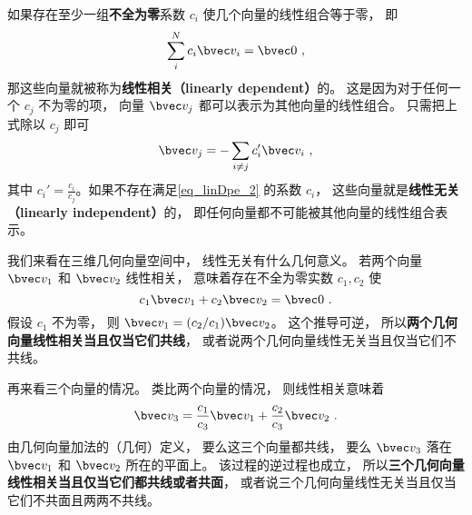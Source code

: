 
\begin{issues}
\issueDraft
\end{issues}


% 

如果存在至少一组\textbf{不全为零}系数 $c_i$ 使几个向量的线性组合等于零， 即
\begin{equation}\label{eq_linDpe_2}
\sum_i^N c_i \bvec v_i = \bvec 0~,
\end{equation}
那这些向量就被称为\textbf{线性相关（linearly dependent）}的。 这是因为对于任何一个 $c_j$ 不为零的项， 向量 $\bvec v_j$ 都可以表示为其他向量的线性组合。 只需把上式除以 $c_j$ 即可
\begin{equation}\label{eq_linDpe_3}
\bvec v_j = -\sum_{i \ne j} c_i' \bvec v_i~,
\end{equation}
其中 $c_i' = \frac{c_i}{c_j}$。如果不存在满足\autoref{eq_linDpe_2} 的系数 $c_i$， 这些向量就是\textbf{线性无关（linearly independent）}的， 即任何向量都不可能被其他向量的线性组合表示。

\begin{example}{ }\label{ex_linDpe_1}
我们来看在三维几何向量空间中， 线性无关有什么几何意义。 若两个向量 $\bvec v_1$ 和 $\bvec v_2$ 线性相关， 意味着存在不全为零实数 $c_1, c_2$ 使
\begin{equation}
c_1 \bvec v_1 + c_2 \bvec v_2 = \bvec 0~.
\end{equation}
假设 $c_1$ 不为零， 则 $\bvec v_1 = (c_2 / c_1) \bvec v_2$。 这个推导可逆， 所以\textbf{两个几何向量线性相关当且仅当它们共线}， 或者说两个几何向量线性无关当且仅当它们不共线。

再来看三个向量的情况。 类比两个向量的情况， 则线性相关意味着
\begin{equation}
\bvec v_3 = \frac{c_1}{c_3} \bvec v_1 +  \frac{c_2}{c_3} \bvec v_2~.
\end{equation}
由几何向量加法的（几何）定义， 要么这三个向量都共线， 要么 $\bvec v_3$ 落在 $\bvec v_1$ 和 $\bvec v_2$ 所在的平面上。 该过程的逆过程也成立， 所以\textbf{三个几何向量线性相关当且仅当它们都共线或者共面}， 或者说三个几何向量线性无关当且仅当它们不共面且两两不共线。
\end{example}

